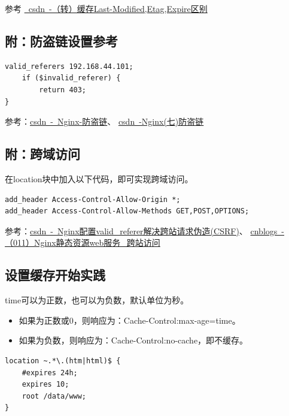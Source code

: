 \documentclass[12pt, a4paper]{article} %
\begin{document}
\begin{CJK*}{UTF8}{gbsn}
参考 \href{https://blog.csdn.net/caseywei/article/details/108389859}{~csdn~-（转）缓存Last-Modified,Etag,Expire区别}

\subsection{附：防盗链设置参考}

\begin{lstlisting}
valid_referers 192.168.44.101;
    if ($invalid_referer) {
        return 403;
}
\end{lstlisting}

参考：\href{https://blog.csdn.net/weixin_46560589/article/details/126411063}{csdn~-~Nginx-防盗链}、
\href{https://blog.csdn.net/weixin_46560589/article/details/126411063}{csdn~-Nginx(七)防盗链}

\subsection{附：跨域访问}

在location块中加入以下代码，即可实现跨域访问。

\begin{lstlisting}
add_header Access-Control-Allow-Origin *;
add_header Access-Control-Allow-Methods GET,POST,OPTIONS;
\end{lstlisting}

参考：\href{https://blog.csdn.net/zhongxj183/article/details/123051546}{csdn~-~Nginx配置valid\_referer解决跨站请求伪造(CSRF)}、
\href{https://www.cnblogs.com/javasl/p/12862697.html}{cnblogs~-（011）Nginx静态资源web服务\_跨站访问}

\clearpage
\subsection{设置缓存开始实践}

time可以为正数，也可以为负数，默认单位为秒。

\begin{itemize}
    \item 如果为正数或0，则响应为：Cache-Control:max-age=time。
    \item 如果为负数，则响应为：Cache-Control:no-cache，即不缓存。
\end{itemize}

\begin{lstlisting}
location ~.*\.(htm|html)$ {
    #expires 24h;
    expires 10;
    root /data/www;
}
\end{lstlisting}


\end{CJK*}
\end{document}
